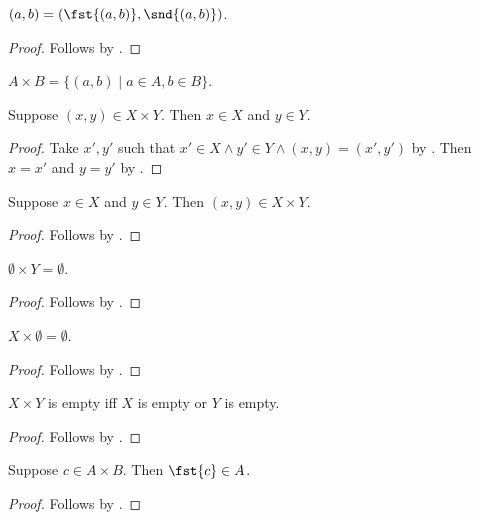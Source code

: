 \begin{proposition}\label{pair_eq_pair_of_proj}
    $(a, b) = (\fst{(a,b)},\snd{(a,b)})$.
\end{proposition}
\begin{proof}
    Follows by .
\end{proof}


\begin{definition}\label{times}
    $A\times B = \{ (a,b) \mid a\in A, b\in B \}$.
\end{definition}

\begin{proposition}\label{times_tuple_elim}
    Suppose $(x, y)\in X\times Y$. Then $x\in X$ and $y\in Y$.
\end{proposition}
\begin{proof}
    Take $x', y'$ such that $x'\in X\land y'\in Y \land (x, y) = (x', y')$
        by .
    Then $x = x'$ and $y = y'$ by .
\end{proof}

\begin{classification}\label{times_tuple_intro}
    Suppose $x\in X$ and $y\in Y$. Then $(x, y)\in X\times Y$.
\end{classification}
\begin{proof}
    Follows by .
\end{proof}

\begin{proposition}\label{times_empty_left}
    $\emptyset\times Y = \emptyset$.
\end{proposition}
\begin{proof}
    Follows by .
\end{proof}

\begin{proposition}\label{times_empty_right}
    $X\times \emptyset = \emptyset$.
\end{proposition}
\begin{proof}
    Follows by .
\end{proof}

\begin{proposition}\label{times_empty_iff}
    $X\times Y$ is empty iff $X$ is empty or $Y$ is empty.
\end{proposition}
\begin{proof}
    Follows by .
\end{proof}

\begin{classification}\label{fst_type}
    Suppose $c\in A\times B$. Then $\fst{c}\in A$.
\end{classification}
\begin{proof}
    Follows by .
\end{proof}

